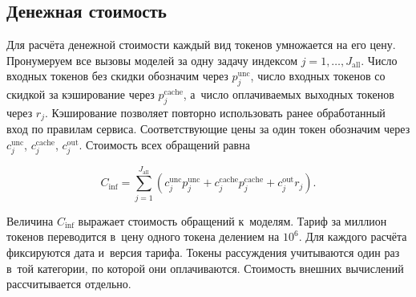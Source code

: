 \subsection{Денежная стоимость}
Для расчёта денежной стоимости каждый вид токенов умножается на его цену. Пронумеруем все вызовы моделей за одну задачу индексом $j=1,\ldots,J_{\mathrm{all}}$. Число входных токенов без скидки обозначим через $p_j^{\mathrm{unc}}$, число входных токенов со скидкой за кэширование через $p_j^{\mathrm{cache}}$, а~число оплачиваемых выходных токенов через $r_j$. Кэширование позволяет повторно использовать ранее обработанный вход по правилам сервиса. Соответствующие цены за один токен обозначим через $c_j^{\mathrm{unc}}$, $c_j^{\mathrm{cache}}$, $c_j^{\mathrm{out}}$. Стоимость всех обращений равна
\begin{formulakey}
\begin{equation}
C_{\mathrm{inf}}=\sum_{j=1}^{J_{\mathrm{all}}}
\left(c_j^{\mathrm{unc}}p_j^{\mathrm{unc}}+
c_j^{\mathrm{cache}}p_j^{\mathrm{cache}}+c_j^{\mathrm{out}}r_j\right).
\label{eq:cost}
\end{equation}
\begin{symbols}
\end{symbols}
\end{formulakey}
Величина $C_{\mathrm{inf}}$ выражает стоимость обращений к~моделям. Тариф за миллион токенов переводится в~цену одного токена делением на $10^6$. Для каждого расчёта фиксируются дата и~версия тарифа. Токены рассуждения учитываются один раз в~той категории, по которой они оплачиваются. Стоимость внешних вычислений рассчитывается отдельно.
